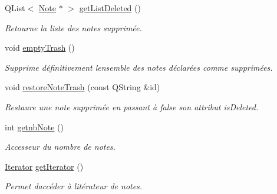 \begin{DoxyCompactItemize}
\mbox{\label{class_notes_manager_ae6b144ba1bc14b895be36b194a2e768e}} 
Q\+List$<$ \hyperlink{class_note}{Note} $\ast$ $>$ \hyperlink{class_notes_manager_ae6b144ba1bc14b895be36b194a2e768e}{get\+List\+Deleted} ()
\begin{DoxyCompactList}\small\item\em Retourne la liste des notes supprimée. \end{DoxyCompactList}\item 
void \hyperlink{class_notes_manager_a84e962ad7fa999cbb687fb43c1b3bab4}{empty\+Trash} ()
\begin{DoxyCompactList}\small\item\em Supprime définitivement l\textquotesingle{}ensemble des notes déclarées comme supprimées. \end{DoxyCompactList}\item 
void \hyperlink{class_notes_manager_abc6587a5d3986ae674e5dd4b9044f348}{restore\+Note\+Trash} (const Q\+String \&id)
\begin{DoxyCompactList}\small\item\em Restaure une note supprimée en passant à false son attribut is\+Deleted. \end{DoxyCompactList}\item 
\mbox{\label{class_notes_manager_a9cab39a524fd23c6523f895e81f75028}} 
int \hyperlink{class_notes_manager_a9cab39a524fd23c6523f895e81f75028}{getnb\+Note} ()
\begin{DoxyCompactList}\small\item\em Accesseur du nombre de notes. \end{DoxyCompactList}\item 
\mbox{\label{class_notes_manager_a4907351a20cc85b1fe0327ac1b15c7da}} 
\hyperlink{class_notes_manager_1_1_iterator}{Iterator} \hyperlink{class_notes_manager_a4907351a20cc85b1fe0327ac1b15c7da}{get\+Iterator} ()
\begin{DoxyCompactList}\small\item\em Permet d\textquotesingle{}accéder à l\textquotesingle{}itérateur de notes. \end{DoxyCompactList}\end{DoxyCompactItemize}
